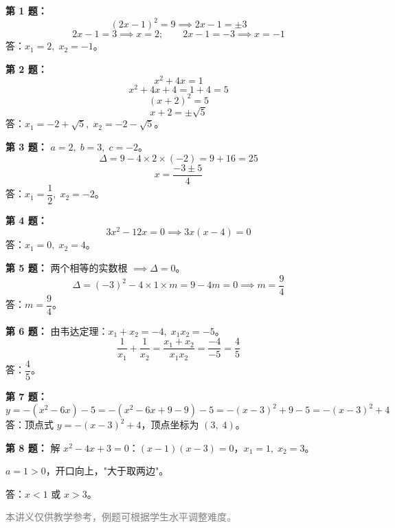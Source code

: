 \documentclass[12pt, a4paper]{ctexart}
\begin{document}
\begin{knowledgebox}[参考答案]

\textbf{第 1 题：}
\[
(2x - 1)^2 = 9 \implies 2x - 1 = \pm 3
\]
\[
2x - 1 = 3 \implies x = 2; \qquad 2x - 1 = -3 \implies x = -1
\]
答：$x_1 = 2,\; x_2 = -1$。

\vspace{8pt}
\textbf{第 2 题：}
\[
x^2 + 4x = 1
\]
\[
x^2 + 4x + 4 = 1 + 4 = 5
\]
\[
(x + 2)^2 = 5
\]
\[
x + 2 = \pm\sqrt{5}
\]
答：$x_1 = -2 + \sqrt{5},\; x_2 = -2 - \sqrt{5}$。

\vspace{8pt}
\textbf{第 3 题：}
$a = 2,\; b = 3,\; c = -2$。
\[
\Delta = 9 - 4 \times 2 \times (-2) = 9 + 16 = 25
\]
\[
x = \frac{-3 \pm 5}{4}
\]
答：$x_1 = \dfrac{1}{2},\; x_2 = -2$。

\vspace{8pt}
\textbf{第 4 题：}
\[
3x^2 - 12x = 0 \implies 3x(x - 4) = 0
\]
答：$x_1 = 0,\; x_2 = 4$。

\vspace{8pt}
\textbf{第 5 题：}
两个相等的实数根 $\implies \Delta = 0$。
\[
\Delta = (-3)^2 - 4 \times 1 \times m = 9 - 4m = 0 \implies m = \frac{9}{4}
\]
答：$m = \dfrac{9}{4}$。

\vspace{8pt}
\textbf{第 6 题：}
由韦达定理：$x_1 + x_2 = -4,\; x_1 x_2 = -5$。
\[
\frac{1}{x_1} + \frac{1}{x_2} = \frac{x_1 + x_2}{x_1 x_2} = \frac{-4}{-5} = \frac{4}{5}
\]
答：$\dfrac{4}{5}$。

\vspace{8pt}
\textbf{第 7 题：}
\[
y = -(x^2 - 6x) - 5 = -(x^2 - 6x + 9 - 9) - 5 = -(x - 3)^2 + 9 - 5 = -(x - 3)^2 + 4
\]
答：顶点式 $y = -(x - 3)^2 + 4$，顶点坐标为 $(3,\; 4)$。

\vspace{8pt}
\textbf{第 8 题：}
解 $x^2 - 4x + 3 = 0$：$(x-1)(x-3)=0$，$x_1 = 1,\; x_2 = 3$。

$a = 1 > 0$，开口向上，"大于取两边"。

答：$x < 1$ 或 $x > 3$。

\end{knowledgebox}

\vfill
\begin{center}
\small\textcolor{gray}{本讲义仅供教学参考，例题可根据学生水平调整难度。}
\end{center}
\end{document}
